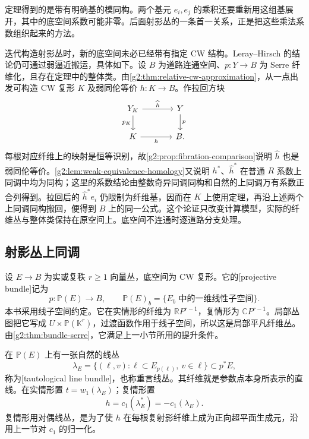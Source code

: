 定理得到的是带有明确基的模同构。两个基元 \(e_i,e_j\) 的乘积还要重新用这组基展开，其中的底空间系数可能非零。后面射影丛的一条首一关系，正是把这些乘法系数组织起来的方法。

\ProseParagraphBreak

迭代构造射影丛时，新的底空间未必已经带有指定 CW 结构。Leray--Hirsch 的结论仍可通过弱逼近搬运，具体如下。设 \(B\) 为道路连通空间、\(p:Y\to B\) 为 Serre 纤维化，且存在定理中的整体类。由\cref{g2:thm:relative-cw-approximation}，从一点出发可构造 CW 复形 \(K\) 及弱同伦等价 \(h:K\to B\)。作拉回方块
\[
	\begin{tikzcd}[column sep=large]
		Y_K \arrow[r,"\widehat h"] \arrow[d,"p_K"'] & Y \arrow[d,"p"]\\
		K \arrow[r,"h"'] & B .
	\end{tikzcd}
\]
每根对应纤维上的映射是恒等识别，故\cref{g2:prop:fibration-comparison}说明 \(\widehat h\) 也是弱同伦等价。\cref{g2:lem:weak-equivalence-homology}又说明 \(h^*\)、\(\widehat h^*\) 在普通 \(R\) 系数上同调中均为同构；这里的系数结论由整数奇异同调同构和自然的上同调万有系数正合列得到。拉回后的 \(\widehat h^*e_i\) 仍限制为纤维基，因而在 \(K\) 上使用定理，再沿上述两个上同调同构搬回，便得到 \(B\) 上的同一公式。这个论证只改变计算模型，实际的纤维丛与整体类保持在原空间上。底空间不连通时逐道路分支处理。

\subsection{射影丛上同调}
\label{g2:subsec:2102:02}
设 \(E\to B\) 为实或复秩 \(r\ge1\) 向量丛，底空间为 CW 复形。它的[projective bundle]记为
\[
	p:\mathbb P(E)\longrightarrow B,\qquad \mathbb P(E)_b=\{\text{\(E_b\) 中的一维线性子空间}\}.
\]
本书采用线子空间约定。它在实情形的纤维为 \(\mathbb RP^{r-1}\)，复情形为 \(\mathbb CP^{r-1}\)。局部丛图把它写成 \(U\times\mathbb P(\mathbb K^r)\)，过渡函数作用于线子空间，所以这是局部平凡纤维丛。由\cref{g2:thm:bundle-serre}，它满足上一小节所用的提升条件。

\ProseParagraphBreak

在 \(\mathbb P(E)\) 上有一张自然的线丛
\[
	\lambda_E=\{(\ell,v):\ell\subset E_{p(\ell)},\ v\in\ell\}\subset p^*E,
\]
称为[tautological line bundle]，也称重言线丛。其纤维就是参数点本身所表示的直线。在实情形置 \(t=w_1(\lambda_E)\)；复情形置
\[
	h=c_1(\lambda_E^*)=-c_1(\lambda_E).
\]
复情形用对偶线丛，是为了使 \(h\) 在每根复射影纤维上成为正向超平面生成元，沿用上一节对 \(c_1\) 的归一化。

